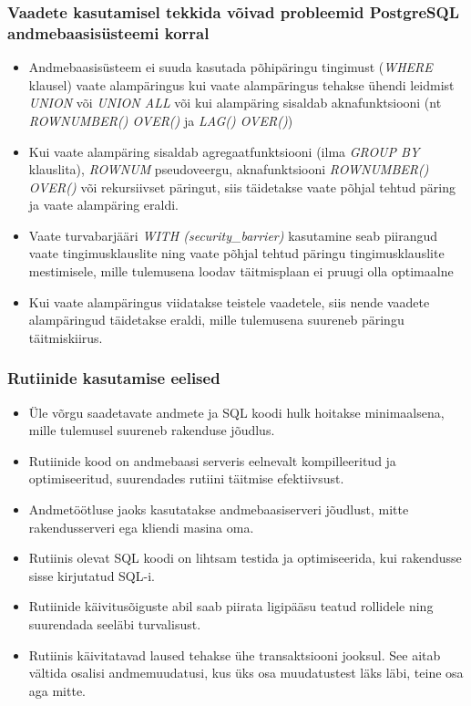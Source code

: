 \documentclass[a4paper,12pt]{article} %
\begin{document}
\subsubsection{Vaadete kasutamisel tekkida võivad probleemid PostgreSQL andmebaasisüsteemi korral}
\begin{itemize}
\item Andmebaasisüsteem ei suuda kasutada põhipäringu tingimust (\textit{WHERE} klausel) vaate alampäringus kui vaate alampäringus tehakse ühendi leidmist \textit{UNION} või \textit{UNION ALL} või kui alampäring sisaldab aknafunktsiooni (nt \textit{ROWNUMBER() OVER()} ja \textit{LAG() OVER()})
\item Kui vaate alampäring sisaldab agregaatfunktsiooni (ilma \textit{GROUP BY} klauslita), \textit{ROWNUM} pseudoveergu, aknafunktsiooni \textit{ROWNUMBER() OVER()} või rekursiivset päringut, siis täidetakse vaate põhjal tehtud päring ja vaate alampäring eraldi.
\item Vaate turvabarjääri \textit{WITH (security\_barrier)} kasutamine seab piirangud vaate tingimusklauslite ning vaate põhjal tehtud päringu tingimusklauslite mestimisele, mille tulemusena loodav täitmisplaan ei pruugi olla optimaalne
\item Kui vaate alampäringus viidatakse teistele vaadetele, siis nende vaadete alampäringud täidetakse eraldi, mille tulemusena suureneb päringu täitmiskiirus.
\end{itemize}
\cite[lk 101-102]{VaadeteMojuParingutele}

\subsubsection{Rutiinide kasutamise eelised}
\begin{itemize}
\item Üle võrgu saadetavate andmete ja SQL koodi hulk hoitakse minimaalsena, mille tulemusel suureneb rakenduse jõudlus.
\item Rutiinide kood on andmebaasi serveris eelnevalt kompilleeritud ja optimiseeritud, suurendades rutiini täitmise efektiivsust.
\item Andmetöötluse jaoks kasutatakse andmebaasiserveri jõudlust, mitte rakendusserveri ega kliendi masina oma.
\item Rutiinis olevat SQL koodi on lihtsam testida ja optimiseerida, kui rakendusse sisse kirjutatud SQL-i.
\item Rutiinide käivitusõiguste abil saab piirata ligipääsu teatud rollidele ning suurendada seeläbi turvalisust.
\item Rutiinis käivitatavad laused tehakse ühe transaktsiooni jooksul. See aitab vältida osalisi andmemuudatusi, kus üks osa muudatustest läks läbi, teine osa aga mitte.
\end{itemize}
\cite[lk 179, 195]{BuildingTheAgileDatabase}
\end{document}

